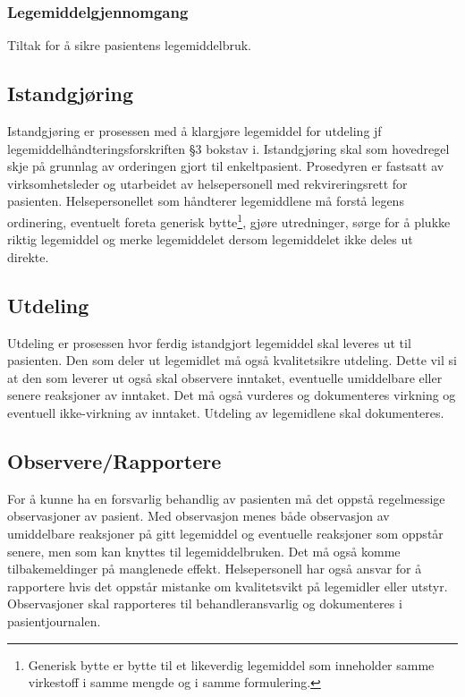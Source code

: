 \subsubsection{Legemiddelgjennomgang}
Tiltak for å sikre pasientens legemiddelbruk.

 

\subsection{Istandgjøring}
Istandgjøring er prosessen med å klargjøre legemiddel for utdeling jf legemiddelhåndteringsforskriften §3 bokstav i. Istandgjøring skal som hovedregel skje på grunnlag av orderingen gjort til enkeltpasient. Prosedyren er fastsatt av virksomhetsleder og utarbeidet av helsepersonell med rekvireringsrett for pasienten. Helsepersonellet som håndterer legemiddlene må forstå legens ordinering, eventuelt foreta generisk bytte\footnote{Generisk bytte er bytte til et likeverdig legemiddel som inneholder samme virkestoff i samme
mengde og i samme formulering.}, gjøre utredninger, sørge for å plukke riktig legemiddel og merke legemiddelet dersom legemiddelet ikke deles ut direkte. \citep{forskrift_legemiddelhandtering}

\subsection{Utdeling}
Utdeling er prosessen hvor ferdig istandgjort legemiddel skal leveres ut til pasienten. Den som deler ut legemidlet må også kvalitetsikre utdeling. Dette vil si at den som leverer ut også skal observere inntaket, eventuelle umiddelbare eller senere reaksjoner av inntaket. Det må også vurderes og dokumenteres virkning og eventuell ikke-virkning av inntaket. Utdeling av legemidlene skal dokumenteres.

\subsection{Observere/Rapportere}
For å kunne ha en forsvarlig behandlig av pasienten må det oppstå regelmessige observasjoner av pasient. Med observasjon menes både observasjon av umiddelbare reaksjoner på gitt legemiddel og eventuelle reaksjoner som oppstår senere, men som kan knyttes til legemiddelbruken. Det må også komme tilbakemeldinger på manglenede effekt. Helsepersonell har også ansvar for å rapportere hvis det oppstår mistanke om kvalitetsvikt på legemidler eller utstyr. Observasjoner skal rapporteres til behandleransvarlig og dokumenteres i pasientjournalen.\citep{forskrift_legemiddelhandtering}


